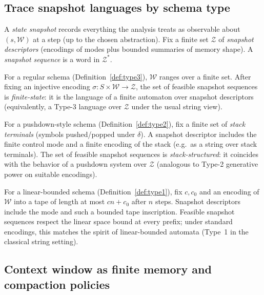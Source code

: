 \subsection{Trace snapshot languages by schema type}

A \emph{state snapshot} records everything the analysis treats as observable about $(s,\mathcal{W})$ at a step (up to the chosen abstraction). Fix a finite set $\mathcal{Z}$ of \emph{snapshot descriptors} (encodings of modes plus bounded summaries of memory shape). A \emph{snapshot sequence} is a word in $\mathcal{Z}^\ast$.

\begin{definition}
\label{def:snap-type3}
For a regular schema (Definition~\ref{def:type3}), $\mathcal{W}$ ranges over a finite set. After fixing an injective encoding $\sigma : S \times \mathcal{W} \to \mathcal{Z}$, the set of feasible snapshot sequences is \emph{finite-state}: it is the language of a finite automaton over snapshot descriptors (equivalently, a Type-3 language over $\mathcal{Z}$ under the usual string view).
\end{definition}

\begin{definition}
\label{def:snap-type2}
For a pushdown-style schema (Definition~\ref{def:type2}), fix a finite set of \emph{stack terminals} (symbols pushed/popped under $\delta$). A snapshot descriptor includes the finite control mode and a finite encoding of the stack (e.g.\ as a string over stack terminals). The set of feasible snapshot sequences is \emph{stack-structured}: it coincides with the behavior of a pushdown system over $\mathcal{Z}$ (analogous to Type-2 generative power on suitable encodings).
\end{definition}

\begin{definition}
\label{def:snap-type1}
For a linear-bounded schema (Definition~\ref{def:type1}), fix $c,c_0$ and an encoding of $\mathcal{W}$ into a tape of length at most $cn+c_0$ after $n$ steps. Snapshot descriptors include the mode and such a bounded tape inscription. Feasible snapshot sequences respect the linear space bound at every prefix; under standard encodings, this matches the spirit of linear-bounded automata (Type~1 in the classical string setting).
\end{definition}

\subsection{Context window as finite memory and compaction policies}

